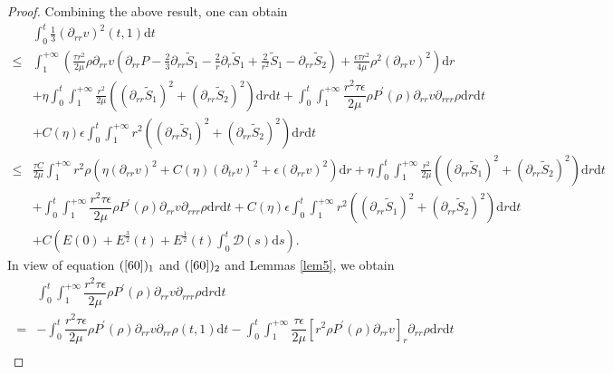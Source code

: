 \documentclass[10pt,reqno]{amsart}
\numberwithin{equation}{section}
\begin{document}
\begin{proof}
		
		Combining the above result, one can obtain
			\begin{align*}
				&\int_{0}^{t}\frac{1}{3}
				(\partial_{rr}v)^2(t,1)\mathrm{d}t\\
				\leq& \int_{1}^{+\infty}\left(
				\frac{\tau r^2}{2\mu}\rho\partial_{rr} v (\partial_{rr} P
				-\frac{2}{3}\partial_{rr} \tilde{S}_1
				-\frac{2}{r}\partial_{r}\tilde{S}_1+\frac{2}{r^2}\tilde{S}_1-\partial_{rr}\tilde{S}_2 ) 
				+\frac{\epsilon\tau r^2}{4\mu}\rho^2(\partial_{rr} v)^2 \right)\mathrm{d}r\\
				&+\eta\int_{0}^{t}\int_{1}^{+\infty}
				\frac{r^2}{2\mu}\left((\partial_{rr} \tilde{S}_1)^2+(\partial_{rr} \tilde{S}_2)^2\right)
				\mathrm{d}r\mathrm{d}t
				+\int_{0}^{t}\int_{1}^{+\infty}\dfrac{r^2\tau\epsilon}{2\mu}\rho P^{\prime}(\rho)\partial_{rr}v\partial_{rrr}\rho \mathrm{d}r\mathrm{d}t\\
				&+C(\eta)\epsilon\int_{0}^{t}\int_{1}^{+\infty}r^2\left((\partial_{rr} \tilde{S}_1)^2+(\partial_{rr} \tilde{S}_2)^2\right)\mathrm{d}r\mathrm{d}t\\
				\leq&\frac{\tau C}{2\mu}\int_{1}^{+\infty} r^2\rho \left(\eta(\partial_{rr}v)^2+C(\eta)(\partial_{tr}v)^2
				+ \epsilon (\partial_{rr}v)^2 \right)\mathrm{d}r
				+\eta\int_{0}^{t}\int_{1}^{+\infty}
				\frac{r^2}{2\mu}\left((\partial_{rr} \tilde{S}_1)^2+(\partial_{rr} \tilde{S}_2)^2\right)
				\mathrm{d}r\mathrm{d}t\\
				&+\int_{0}^{t}\int_{1}^{+\infty}\dfrac{r^2\tau\epsilon}{2\mu}\rho P^{\prime}(\rho)\partial_{rr}v\partial_{rrr}\rho \mathrm{d}r\mathrm{d}t
				+C(\eta)\epsilon\int_{0}^{t}\int_{1}^{+\infty}r^2\left((\partial_{rr} \tilde{S}_1)^2+(\partial_{rr} \tilde{S}_2)^2\right)\mathrm{d}r\mathrm{d}t\\
				&
				+C\left(E(0)+ E^{\frac{3}{2}}(t)+ E^{\frac{1}{2}}(t) \int_{0}^{t}\mathcal{D}(s)\mathrm{d}s\right).
			\end{align*}
		In view of equation $(\ref{60})_1$ and $(\ref{60})_2$ and Lemmas \ref{lem5}, we obtain
		\begin{equation}\nonumber
			\begin{aligned}
				&\int_{0}^{t}\int_{1}^{+\infty}\dfrac{r^2\tau\epsilon}{2\mu}\rho P^{\prime}(\rho)\partial_{rr}v\partial_{rrr}\rho \mathrm{d}r\mathrm{d}t\\
				=&-\int_{0}^{t}\dfrac{r^2\tau\epsilon}{2\mu}\rho P^{\prime}(\rho)\partial_{rr}v\partial_{rr}\rho(t,1)\mathrm{d}t-
				\int_{0}^{t}\int_{1}^{+\infty}\dfrac{\tau\epsilon}{2\mu}[r^2\rho P^{\prime}(\rho)\partial_{rr}v]_r\partial_{rr}\rho \mathrm{d}r\mathrm{d}t\\

\end{aligned}
\end{equation}
\end{proof}
\end{document}
